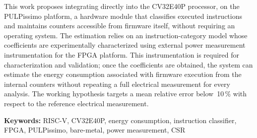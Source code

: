 This work proposes integrating directly into the CV32E40P processor, on the
PULPissimo platform, a hardware module that classifies executed instructions and
maintains counters accessible from firmware itself, without requiring an
operating system. The estimation relies on an instruction-category model whose
coefficients are experimentally characterized using external power measurement
instrumentation for the FPGA platform. This instrumentation is required for
characterization and validation; once the coefficients are obtained, the system
can estimate the energy consumption associated with firmware execution from the
internal counters without repeating a full electrical measurement for every
analysis. The working hypothesis targets a mean relative error below~10\,\%
with respect to the reference electrical measurement.

\bigskip
\textbf{Keywords:} RISC-V, CV32E40P, energy consumption, instruction classifier,
FPGA, PULPissimo, bare-metal, power measurement, CSR

\cleardoublepage

